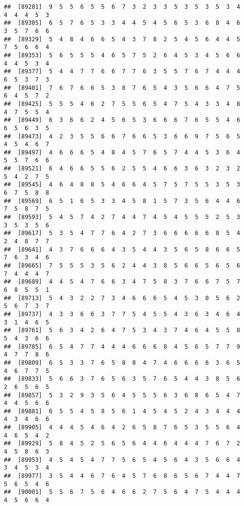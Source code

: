 \documentclass[
]{book}
\begin{document}
\begin{verbatim}
##  [89281]  9  5  5  6  5  5  6  7  3  2  3  3  5  3  5  3  5  3  4  4  4  4  5  3
##  [89305]  6  5  7  6  5  3  3  4  4  5  4  5  6  5  3  6  8  4  6  3  5  7  6  6
##  [89329]  5  4  8  4  6  6  5  4  3  7  8  2  5  4  5  6  4  4  5  7  5  6  6  4
##  [89353]  5  6  5  5  5  4  6  5  7  5  2  6  4  5  3  4  5  6  6  4  4  5  3  4
##  [89377]  5  4  4  7  7  6  6  7  7  6  3  5  5  7  6  7  4  4  4  6  5  3  7  3
##  [89401]  7  6  7  6  6  5  3  8  7  6  5  4  3  5  6  6  4  7  5  6  4  5  7  2
##  [89425]  5  5  5  4  6  2  7  5  5  6  5  4  7  5  4  3  3  4  8  4  7  5  5  4
##  [89449]  6  3  6  6  2  4  5  6  5  3  6  6  6  7  6  5  5  4  6  6  5  6  3  5
##  [89473]  4  2  3  5  5  6  6  7  6  6  5  3  6  6  9  7  5  6  5  4  5  4  6  7
##  [89497]  4  6  6  6  5  4  8  4  5  7  6  5  7  4  4  5  3  6  4  5  5  7  6  6
##  [89521]  6  4  6  6  5  5  6  2  5  5  4  6  6  3  6  3  2  3  2  5  4  2  7  5
##  [89545]  4  6  4  8  8  5  4  6  6  4  5  7  5  7  5  5  3  5  3  6  7  5  8  8
##  [89569]  6  5  1  6  5  3  3  4  5  8  1  5  7  3  5  6  4  4  6  7  5  8  7  5
##  [89593]  5  4  5  7  4  2  7  4  4  7  4  5  4  5  5  5  2  5  3  3  5  3  5  6
##  [89617]  5  3  5  4  7  7  6  4  2  7  3  6  6  6  6  6  8  5  4  2  4  8  7  7
##  [89641]  4  3  7  6  6  6  4  3  5  4  4  3  5  6  5  8  6  6  5  7  6  3  4  6
##  [89665]  7  5  5  5  3  5  6  2  4  4  3  8  5  6  6  5  6  5  6  7  4  4  4  7
##  [89689]  4  4  5  4  7  6  6  3  4  7  5  8  3  7  6  6  7  5  7  6  8  5  5  1
##  [89713]  5  4  3  2  2  7  3  4  6  6  6  5  4  5  3  0  5  6  2  5  6  7  3  7
##  [89737]  4  3  3  6  6  3  7  7  5  4  5  5  4  3  6  3  4  6  4  3  1  4  6  5
##  [89761]  5  6  3  4  2  6  4  7  5  3  4  3  7  4  6  4  5  5  8  5  4  3  6  6
##  [89785]  6  5  4  7  7  4  4  4  6  6  6  8  4  5  6  5  7  7  9  4  7  7  8  6
##  [89809]  6  5  3  3  7  6  5  8  8  4  7  4  6  6  6  6  3  6  5  4  6  7  7  5
##  [89833]  5  6  6  3  7  6  5  6  3  5  7  6  5  4  4  3  8  5  6  2  6  5  6  5
##  [89857]  5  3  2  9  3  5  6  4  5  5  5  6  3  6  8  6  5  4  7  4  4  5  6  6
##  [89881]  6  5  5  4  5  8  5  6  1  4  5  4  5  2  4  3  4  4  4  4  3  4  6  6
##  [89905]  4  4  4  5  4  6  4  2  6  5  8  7  6  5  3  5  5  6  4  4  6  5  4  2
##  [89929]  5  8  4  5  2  5  6  5  6  4  4  6  4  4  4  7  6  7  2  4  5  8  6  3
##  [89953]  4  5  4  5  4  7  7  5  6  5  4  5  6  4  3  5  6  6  4  3  4  5  3  4
##  [89977]  3  5  4  4  6  7  6  4  5  7  6  8  6  5  6  7  4  4  7  5  6  5  4  6
##  [90001]  5  5  6  7  5  6  4  6  6  2  7  5  6  4  7  5  4  4  4  4  5  6  6  4

\end{verbatim}
\end{document}
